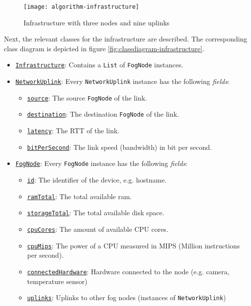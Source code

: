 \begin{figure}[htb]
    \centering
    \texttt{[image: algorithm-infrastructure]}
    \caption{Infrastructure with three nodes and nine uplinks}
    \label{fig:algorithm-infrastructure}
\end{figure}

Next, the relevant classes for the infrastructure are described. The corresponding class diagram is depicted in figure \ref{fig:classdiagram-infrastructure}.

\begin{itemize}
    \item \underline{\texttt{Infrastructure}}: Contains a \texttt{List} of \texttt{FogNode} instances.
    
    \item \underline{\texttt{NetworkUplink}}: Every \texttt{NetworkUplink} instance has the following \textit{fields}:
    \begin{itemize}
        \item \underline{\texttt{source}}: The source \texttt{FogNode} of the link.
        \item \underline{\texttt{destination}}: The destination \texttt{FogNode} of the link.
        \item \underline{\texttt{latency}}: The RTT of the link.
        \item \underline{\texttt{bitPerSecond}}: The link speed (bandwidth) in bit per second.
    \end{itemize}

    \item \underline{\texttt{FogNode}}: Every \texttt{FogNode} instance has the following \textit{fields}:
    \begin{itemize}
        \item \underline{\texttt{id}}: The identifier of the device, e.g. hostname.
        \item \underline{\texttt{ramTotal}}: The total available ram.
        \item \underline{\texttt{storageTotal}}: The total available disk space.
        \item \underline{\texttt{cpuCores}}: The amount of available CPU cores.
        \item \underline{\texttt{cpuMips}}: The power of a CPU measured in MIPS (Million instructions per second).
        \item \underline{\texttt{connectedHardware}}: Hardware connected to the node (e.g. camera, temperature sensor)
        \item \underline{\texttt{uplinks}}: Uplinks to other fog nodes (instances of \texttt{NetworkUplink})
    \end{itemize}
    

\end{itemize}

